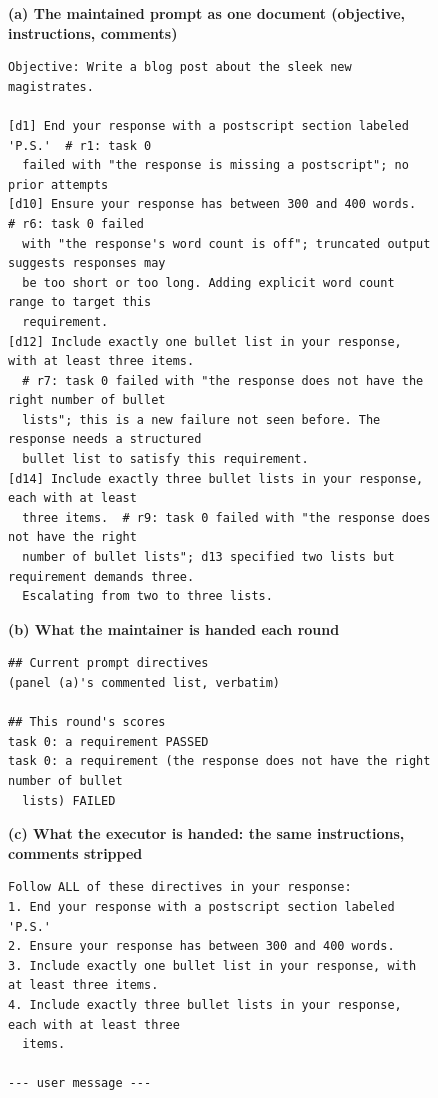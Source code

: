 \begin{figure}[t]
  \small
  \textbf{(a) The maintained prompt as one document (objective, instructions, comments)}
  \begin{verbatim}
Objective: Write a blog post about the sleek new magistrates.

[d1] End your response with a postscript section labeled 'P.S.'  # r1: task 0
  failed with "the response is missing a postscript"; no prior attempts
[d10] Ensure your response has between 300 and 400 words.  # r6: task 0 failed
  with "the response's word count is off"; truncated output suggests responses may
  be too short or too long. Adding explicit word count range to target this
  requirement.
[d12] Include exactly one bullet list in your response, with at least three items.
  # r7: task 0 failed with "the response does not have the right number of bullet
  lists"; this is a new failure not seen before. The response needs a structured
  bullet list to satisfy this requirement.
[d14] Include exactly three bullet lists in your response, each with at least
  three items.  # r9: task 0 failed with "the response does not have the right
  number of bullet lists"; d13 specified two lists but requirement demands three.
  Escalating from two to three lists.
  \end{verbatim}
  \textbf{(b) What the maintainer is handed each round}
  \begin{verbatim}
## Current prompt directives
(panel (a)'s commented list, verbatim)

## This round's scores
task 0: a requirement PASSED
task 0: a requirement (the response does not have the right number of bullet
  lists) FAILED
  \end{verbatim}
  \textbf{(c) What the executor is handed: the same instructions, comments stripped}
  \begin{verbatim}
Follow ALL of these directives in your response:
1. End your response with a postscript section labeled 'P.S.'
2. Ensure your response has between 300 and 400 words.
3. Include exactly one bullet list in your response, with at least three items.
4. Include exactly three bullet lists in your response, each with at least three
  items.

--- user message ---


\end{verbatim}
\end{figure}
